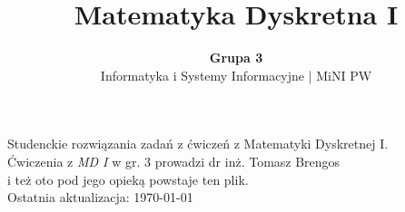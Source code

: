 \documentclass{mwart}
\author{\textbf{Grupa 3} \\ \textsf{Informatyka i Systemy Informacyjne | MiNI PW}}
\title{%
\textbf{Matematyka Dyskretna I}}
\begin{document}
\maketitle{}
\begin{center}
    Studenckie rozwiązania zadań z ćwiczeń z Matematyki Dyskretnej I. \\
    Ćwiczenia z \emph{MD I} w gr. 3 prowadzi dr inż. Tomasz Brengos \\
    i też oto pod jego opieką powstaje ten plik. \\
    Ostatnia aktualizacja: \today{} \\
    \tableofcontents
    \thispagestyle{specialfooter}

\end{center}


















\newpage
\end{document}
